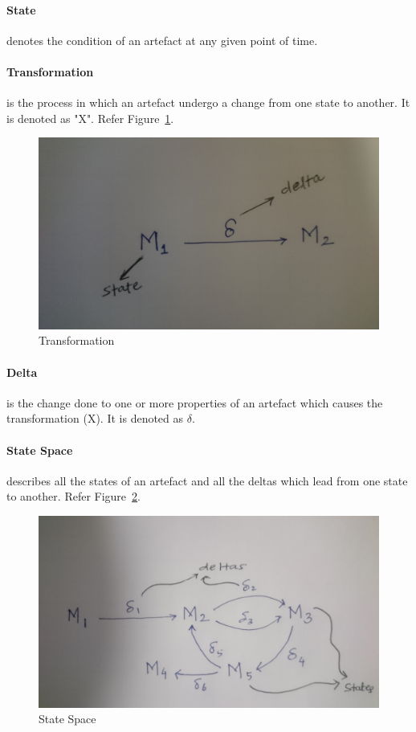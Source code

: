 \paragraph{State} denotes the condition of an artefact at any given point of time.
\paragraph{Transformation} is the process in which an artefact undergo a change from one state to another. It is denoted as "X". Refer Figure~\ref{fig:Transformation_Diagram}.
\begin{figure}
	\includegraphics[width=1\textwidth]{figures/Transformation}
	\caption{Transformation}
	\label{fig:Transformation_Diagram}
\end{figure}
\paragraph{Delta} is the change done to one or more properties of an artefact which causes the transformation (X). It is denoted as $\delta$.
\paragraph{State Space} describes all the states of an artefact and all the deltas which lead from one state to another. Refer Figure~\ref{fig:StateSpace_Diagram}.
\begin{figure}
	\includegraphics[width=1\textwidth]{figures/State_Space}
	\caption{State Space}
	\label{fig:StateSpace_Diagram}
\end{figure}
